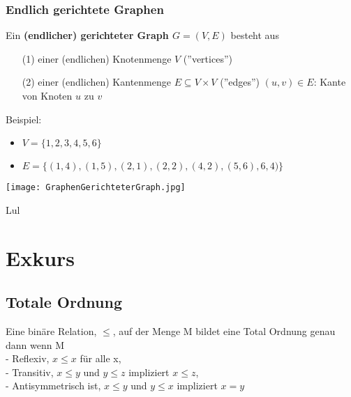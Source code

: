 		\subsubsection{Endlich gerichtete Graphen}
			\begin{minipage}{0.6\textwidth}
				Ein \textbf{(endlicher) gerichteter Graph $G = (V,E)$} besteht aus
				\begin{itemize}
					\item[(1)] einer (endlichen) Knotenmenge $V$ (''vertices'')
					\item[(2)] einer (endlichen) Kantenmenge $ E \subseteq V \times V$ (''edges'') 
							$(u,v) \in E$: Kante von Knoten $u$ zu $v$ \\
				\end{itemize}

				Beispiel: 
				\begin{itemize}
					\item $V = \{1,2,3,4,5,6\}$
					\item $E = \{(1,4),(1,5),(2,1),(2,2),(4,2),(5,6),6,4)\}$
				\end{itemize}
			\end{minipage}
			\hspace{1cm}
			\begin{minipage}{0.35\textwidth}
				\begin{center}
					\texttt{[image: GraphenGerichteterGraph.jpg]}
				\end{center}
			\end{minipage}

			Lul


\newpage
\section{Exkurs}
	\subsection{Totale Ordnung}
		Eine binäre Relation, $\leq$, auf der Menge M bildet eine Total Ordnung genau dann wenn M \\
		- Reflexiv, $x \leq x$ für alle x, \\
		- Transitiv, $x \leq y$ und $y \leq z$ impliziert $x \leq z$, \\
		- Antisymmetrisch ist, $x \leq y$ und $y \leq x$ impliziert $x = y$



\vspace{1.5cm}
 